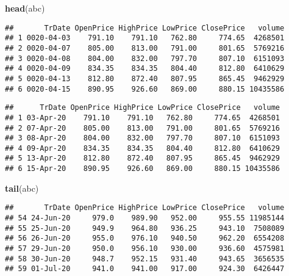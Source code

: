 \documentclass[
]{article}
\newenvironment{Shaded}{\begin{snugshade}}{\end{snugshade}}
\newcommand{\DataTypeTok}[1]{\textcolor[rgb]{0.13,0.29,0.53}{#1}}
\newcommand{\KeywordTok}[1]{\textcolor[rgb]{0.13,0.29,0.53}{\textbf{#1}}}
\newcommand{\NormalTok}[1]{#1}
\newcommand{\OperatorTok}[1]{\textcolor[rgb]{0.81,0.36,0.00}{\textbf{#1}}}
\newcommand{\StringTok}[1]{\textcolor[rgb]{0.31,0.60,0.02}{#1}}
\begin{document}
\begin{Shaded}
\begin{Highlighting}[]
\KeywordTok{head}\NormalTok{(abc)}
\end{Highlighting}
\end{Shaded}

\begin{verbatim}
##       TrDate OpenPrice HighPrice LowPrice ClosePrice   volume
## 1 0020-04-03    791.10    791.10   762.80     774.65  4268501
## 2 0020-04-07    805.00    813.00   791.00     801.65  5769216
## 3 0020-04-08    804.00    832.00   797.70     807.10  6151093
## 4 0020-04-09    834.35    834.35   804.40     812.80  6410629
## 5 0020-04-13    812.80    872.40   807.95     865.45  9462929
## 6 0020-04-15    890.95    926.60   869.00     880.15 10435586
\end{verbatim}

\begin{Shaded}
\end{Shaded}

\begin{verbatim}
##      TrDate OpenPrice HighPrice LowPrice ClosePrice   volume
## 1 03-Apr-20    791.10    791.10   762.80     774.65  4268501
## 2 07-Apr-20    805.00    813.00   791.00     801.65  5769216
## 3 08-Apr-20    804.00    832.00   797.70     807.10  6151093
## 4 09-Apr-20    834.35    834.35   804.40     812.80  6410629
## 5 13-Apr-20    812.80    872.40   807.95     865.45  9462929
## 6 15-Apr-20    890.95    926.60   869.00     880.15 10435586
\end{verbatim}

\begin{Shaded}
\begin{Highlighting}[]
\KeywordTok{tail}\NormalTok{(abc)}
\end{Highlighting}
\end{Shaded}

\begin{verbatim}
##       TrDate OpenPrice HighPrice LowPrice ClosePrice   volume
## 54 24-Jun-20     979.0    989.90   952.00     955.55 11985144
## 55 25-Jun-20     949.9    964.80   936.25     943.10  7508089
## 56 26-Jun-20     955.0    976.10   940.50     962.20  6554208
## 57 29-Jun-20     950.0    956.10   930.00     936.60  4575981
## 58 30-Jun-20     948.7    952.15   931.40     943.65  3656535
## 59 01-Jul-20     941.0    941.00   917.00     924.30  6426447
\end{verbatim}
\end{document}
